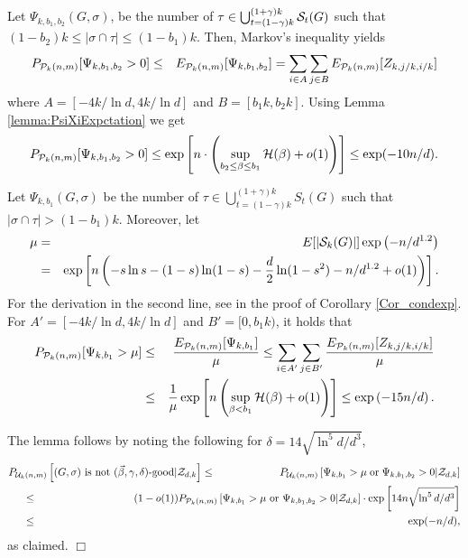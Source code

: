 \documentclass[a4paper,10pt]{article}
\makeatletter
\newenvironment{proof}{\noindent{\bf Proof\@:}}{\hfill $\Box$\\}
\newcommand\cU{\mathcal{U}}
\newcommand\cP{\mathcal{P}}
\newcommand\cZ{\mathcal{Z}}
\makeatother
\begin{document}
\begin{proof}
Let $\Psi_{k,b_1,b_2}(G,\sigma)$, be the number of $\tau\in
\bigcup_{t=(1-\gamma)k}^{(1+\gamma)k}{\cal S}_t(G)$ such that
$(1-b_2)k\leq |\sigma\cap \tau|\leq (1-b_1)k$. Then,  Markov's
inequality yields
\begin{eqnarray}
P_{{\cal P}_{k}(n,m)}[\Psi_{k,b_1,b_2}>0]&\leq& E_{{\cal P}_{k}(n,m)}[\Psi_{k,b_1,b_2}]=
\sum_{i\in A }\sum_{j\in B }E_{{\cal P}_{k}(n,m)}[Z_{k, j/k ,i/k}] \nonumber 
\end{eqnarray}
where $A=[-4k/\ln d, 4k/\ln d ]$ and $B=[b_1k, b_2k]$. Using Lemma
\ref{lemma:PsiXiExpctation} we get 
\begin{eqnarray}
P_{{\cal P}_{k}(n,m)}[\Psi_{k,b_1,b_2}>0]\leq 
\exp\left[n \cdot \left(\sup_{b_2\leq \beta\leq b_1}{\cal H}(\beta)+o(1)\right)\right]\leq \exp(-10n/d).
\end{eqnarray}

\noindent
Let $\Psi_{k,b_1}(G,\sigma)$ be the number of $\tau\in
\bigcup_{t=(1-\gamma)k}^{(1+\gamma)k}S_{t}(G)$ such that $|\sigma
\cap \tau|>(1-b_1)k$. Moreover, let \begin{eqnarray}
\mu &=& E[|{\cal S}_k(G)|]\exp\left(-n/d^{1.2}\right)\nonumber \\
&=& \exp\left[n\left(-s\ln s-(1-s)\ln(1-s)-\frac{d}{2}\ln(1-s^2)-n/d^{1.2}+o(1)\right)\right]. \nonumber
\end{eqnarray}
For the derivation in the second line, see in the proof of Corollary
\ref{Cor_condexp}.
For $A'=[-4k/\ln d, 4k/\ln d]$ and $B'=[0,b_1k)$, it holds that
\begin{eqnarray}
P_{{\cal P}_k(n,m)}[\Psi_{k,b_1}>\mu] &\leq & 
\frac{E_{{\cal P}_k(n,m)}[\Psi_{k,b_1}]}{\mu} \leq 
\sum_{i\in A'}\sum_{j\in B'}\frac{E_{{\cal P}_k(n,m)}[Z_{k,j/k,i/k}]}{\mu}
\nonumber 
\\
&\leq &\frac{1}{\mu}\exp\left[ n \left(\sup_{\beta<b_1}{\cal H}(\beta)+o(1)\right) \right]
\leq \exp\left(-15n/d\right). \nonumber 
\end{eqnarray}


\noindent
The lemma follows by noting the following for $\delta=14\sqrt{\ln^5 d/d^3}$, 
\begin{eqnarray}
P_{\cU_k(n,m)}\left[(G,\sigma)\mbox{ is not $(\vec{\beta },\gamma,\delta)$-good}|\cZ_{d,k} \right] 
&\leq&  P_{\cU_k(n,m)}\left[\Psi_{k,b_1}>\mu \;\textrm{or}\;\Psi_{k,b_1,b_2}>0|\cZ_{d,k}\right] 
\nonumber \\
&\hspace*{-6cm}\leq &\hspace*{-3cm}(1-o(1))P_{\cP_k(n,m)}\left[\Psi_{k,b_1}>\mu \mbox{ or } \Psi_{k,b_1,b_2}>0|\cZ_{d,k}\right] \cdot \exp\left[ 14n\sqrt{\ln^5d/d^3}\right] 
\nonumber \\
&\hspace*{-6cm}\leq &\hspace*{-3cm}\exp(-n/d), \nonumber
\end{eqnarray}
as claimed.
\end{proof}
\end{document}
